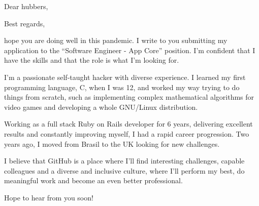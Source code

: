 \documentclass[a4paper,10pt]{moderncv}
\begin{document}
\clearpage


\date{April 26, 2021}
\opening{Dear hubbers,}
\closing{Best regards,}
\makelettertitle

hope you are doing well in this pandemic. I write to you submitting my application to the “Software Engineer - App Core” position. I’m confident that I have the skills and that the role is what I’m looking for.

I'm a passionate self-taught hacker with diverse experience. I learned my first programming language, C, when I was 12, and worked my way trying to do things from scratch, such as implementing complex mathematical algorithms for video games and developing a whole GNU/Linux distribution.

Working as a full stack Ruby on Rails developer for 6 years, delivering excellent results and constantly improving myself, I had a rapid career progression. Two years ago, I moved from Brasil to the UK looking for new challenges.

I believe that GitHub is a place where I’ll find interesting challenges, capable colleagues and a diverse and inclusive culture, where I’ll perform my best, do meaningful work and become an even better professional.

Hope to hear from you soon!

\makeletterclosing
\end{document}
